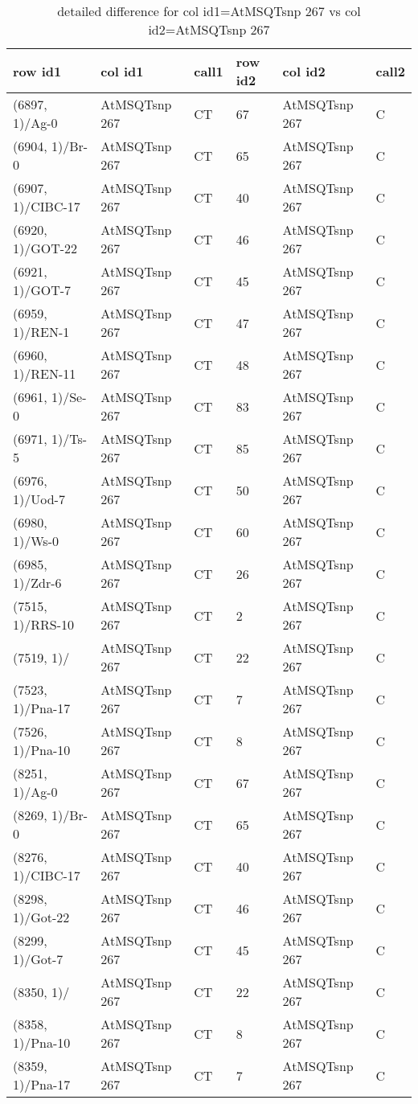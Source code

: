 \begin{center}
\begin{longtable}{|l|l|l|l|l|l|}
\caption{detailed difference for col id1=AtMSQTsnp 267 vs col id2=AtMSQTsnp 267} \label{table_dm807}\\
\hline
row id1&col id1&call1&row id2&col id2&call2\\
\hline
(6897, 1)/Ag-0&AtMSQTsnp 267&CT&67&AtMSQTsnp 267&C\\
(6904, 1)/Br-0&AtMSQTsnp 267&CT&65&AtMSQTsnp 267&C\\
(6907, 1)/CIBC-17&AtMSQTsnp 267&CT&40&AtMSQTsnp 267&C\\
(6920, 1)/GOT-22&AtMSQTsnp 267&CT&46&AtMSQTsnp 267&C\\
(6921, 1)/GOT-7&AtMSQTsnp 267&CT&45&AtMSQTsnp 267&C\\
(6959, 1)/REN-1&AtMSQTsnp 267&CT&47&AtMSQTsnp 267&C\\
(6960, 1)/REN-11&AtMSQTsnp 267&CT&48&AtMSQTsnp 267&C\\
(6961, 1)/Se-0&AtMSQTsnp 267&CT&83&AtMSQTsnp 267&C\\
(6971, 1)/Ts-5&AtMSQTsnp 267&CT&85&AtMSQTsnp 267&C\\
(6976, 1)/Uod-7&AtMSQTsnp 267&CT&50&AtMSQTsnp 267&C\\
(6980, 1)/Ws-0&AtMSQTsnp 267&CT&60&AtMSQTsnp 267&C\\
(6985, 1)/Zdr-6&AtMSQTsnp 267&CT&26&AtMSQTsnp 267&C\\
(7515, 1)/RRS-10&AtMSQTsnp 267&CT&2&AtMSQTsnp 267&C\\
(7519, 1)/&AtMSQTsnp 267&CT&22&AtMSQTsnp 267&C\\
(7523, 1)/Pna-17&AtMSQTsnp 267&CT&7&AtMSQTsnp 267&C\\
(7526, 1)/Pna-10&AtMSQTsnp 267&CT&8&AtMSQTsnp 267&C\\
(8251, 1)/Ag-0&AtMSQTsnp 267&CT&67&AtMSQTsnp 267&C\\
(8269, 1)/Br-0&AtMSQTsnp 267&CT&65&AtMSQTsnp 267&C\\
(8276, 1)/CIBC-17&AtMSQTsnp 267&CT&40&AtMSQTsnp 267&C\\
(8298, 1)/Got-22&AtMSQTsnp 267&CT&46&AtMSQTsnp 267&C\\
(8299, 1)/Got-7&AtMSQTsnp 267&CT&45&AtMSQTsnp 267&C\\
(8350, 1)/&AtMSQTsnp 267&CT&22&AtMSQTsnp 267&C\\
(8358, 1)/Pna-10&AtMSQTsnp 267&CT&8&AtMSQTsnp 267&C\\
(8359, 1)/Pna-17&AtMSQTsnp 267&CT&7&AtMSQTsnp 267&C\\

\end{longtable}
\end{center}
